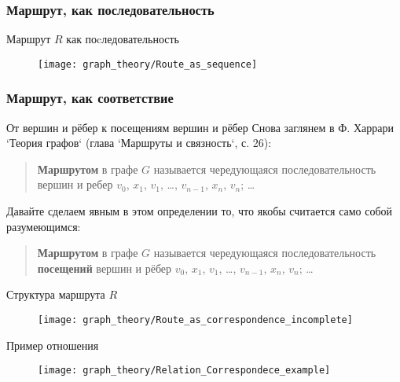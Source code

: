\subsubsection{Маршрут, как последовательность}

\begin{frame}{Маршрут $R$ как поcледовательность}
  \begin{figure}
    \centering
    \texttt{[image: graph\_theory/Route\_as\_sequence]}
  \end{figure}
\end{frame}

\subsubsection{Маршрут, как соответствие}

\begin{frame}{От вершин и рёбер к посещениям вершин и рёбер}
  Снова заглянем в Ф. Харрари `Теория графов` (глава `Маршруты и связность`, с. 26):
  \begin{quote}
    \textbf{Маршрутом} в графе $G$ называется чередующаяся
    последовательность вершин и ребер $v_0$, $x_1$, $v_1$, \dots,
    $v_{n-1}$, $x_n$, $v_n$; \dots
  \end{quote}

  Давайте сделаем явным в этом определении то, что якобы считается
  само собой разумеющимся:
  \begin{quote}
    \textbf{Маршрутом} в графе $G$ называется чередующаяся
    последовательность \textbf{посещений} вершин и рёбер $v_0$, $x_1$,
    $v_1$, \dots, $v_{n-1}$, $x_n$, $v_n$; \dots
  \end{quote}
\end{frame}

\begin{frame}{Структура маршрута $R$}
  \begin{figure}
    \centering
    \texttt{[image: graph\_theory/Route\_as\_correspondence\_incomplete]}
  \end{figure}
\end{frame}

\begin{frame}{Пример отношения }
  \begin{figure}
    \centering
    \texttt{[image: graph\_theory/Relation\_Correspondece\_example]}
  \end{figure}
\end{frame}

